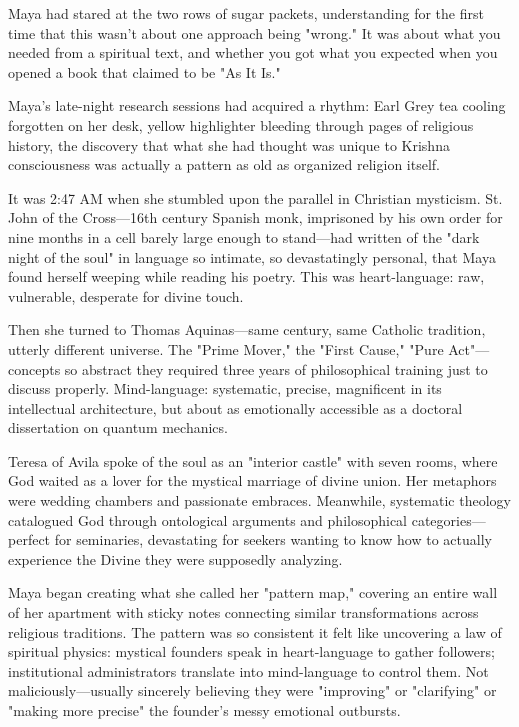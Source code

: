 \documentclass[12pt,twoside]{book}
\begin{document}
Maya had stared at the two rows of sugar packets, understanding for the first time that this wasn't about one approach being "wrong." It was about what you needed from a spiritual text, and whether you got what you expected when you opened a book that claimed to be "As It Is."

Maya's late-night research sessions had acquired a rhythm: Earl Grey tea cooling forgotten on her desk, yellow highlighter bleeding through pages of religious history, the discovery that what she had thought was unique to Krishna consciousness was actually a pattern as old as organized religion itself.

It was 2:47 AM when she stumbled upon the parallel in Christian mysticism. St. John of the Cross—16th century Spanish monk, imprisoned by his own order for nine months in a cell barely large enough to stand—had written of the "dark night of the soul" in language so intimate, so devastatingly personal, that Maya found herself weeping while reading his poetry. This was heart-language: raw, vulnerable, desperate for divine touch.

Then she turned to Thomas Aquinas—same century, same Catholic tradition, utterly different universe. The "Prime Mover," the "First Cause," "Pure Act"—concepts so abstract they required three years of philosophical training just to discuss properly. Mind-language: systematic, precise, magnificent in its intellectual architecture, but about as emotionally accessible as a doctoral dissertation on quantum mechanics.

Teresa of Avila spoke of the soul as an "interior castle" with seven rooms, where God waited as a lover for the mystical marriage of divine union. Her metaphors were wedding chambers and passionate embraces. Meanwhile, systematic theology catalogued God through ontological arguments and philosophical categories—perfect for seminaries, devastating for seekers wanting to know how to actually experience the Divine they were supposedly analyzing.

Maya began creating what she called her "pattern map," covering an entire wall of her apartment with sticky notes connecting similar transformations across religious traditions. The pattern was so consistent it felt like uncovering a law of spiritual physics: mystical founders speak in heart-language to gather followers; institutional administrators translate into mind-language to control them. Not maliciously—usually sincerely believing they were "improving" or "clarifying" or "making more precise" the founder's messy emotional outbursts.
\end{document}

